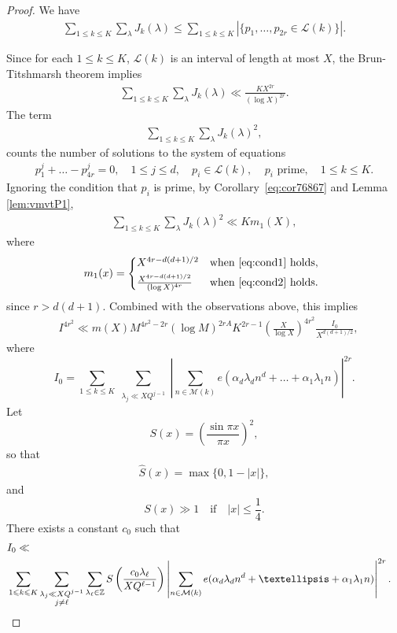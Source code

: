 \documentclass[12pt]{amsart}
\def\cL{{\mathcal L}}
\def\cM{{\mathcal M}}
\def\Z{{\mathbb Z}}
\def\\{\cr}
\def\le{\leqslant}
\begin{document}
\begin{proof}
We have 
\begin{align*}
\sum_{1\le k \le K}\sum_{\lambda} J_k(\lambda)\le \sum_{1\le k \le K}|\{ p_1,\dots,p_{2r}\in \cL(k)\}|.
\end{align*}



Since for each $1\le k \le K$,  $\cL(k)$ is an interval of length at most $X$, the Brun-Titshmarsh theorem implies 
\begin{align*}
\sum_{1\le k \le K}\sum_{\lambda} J_k(\lambda)\ll \frac{KX^{2r}}{(\log{X})^{2r}}.
\end{align*}
The term
\begin{align*}
\sum_{1\le k \le K}\sum_{\lambda} J_k(\lambda)^2,
\end{align*}
counts the number of solutions to the system of equations 
\begin{align}
\label{eq:123456-1}
p_1^{j}+\dots-p_{4r}^{j}=0, \quad 1\le j \le d, \quad p_i\in \cL(k), \ \ \text{ $p_i$ prime}, \quad 1\le k \le K.
\end{align}
Ignoring the condition that $p_i$ is prime, by Corollary~\ref{eq:cor76867} and Lemma \ref{lem:vmvtP1},
\begin{align*}
\sum_{1\le k \le K}\sum_{\lambda} J_k(\lambda)^2\ll K m_1(X), 
\end{align*}
where
$$m_1(x)=\begin{cases*}
X^{4r-d(d+1)/2}& \textit{when} \eqref{eq:cond1} \textit{holds},\\
\frac{X^{4r-d(d+1)/2}}{(\log X)^{4r}} & \textit{when} \eqref{eq:cond2} \textit{holds}.
\end{cases*} $$
since $r>d(d+1)$. Combined with the observations above, this implies 
\begin{align}
\label{eq:II0}
& I^{4r^2}\ll m(X) M^{4r^2-2r}(\log{M})^{2rA}K^{2r-1}\left(\frac{X}{\log{X}}\right)^{4r^2}\frac{I_0}{X^{d(d+1)/2}},
\end{align}
where 
$$I_0=\sum_{1\le k \le K}\sum_{\substack{ \lambda_j \ll XQ^{j-1}}}\left|\sum_{n\in \cM(k)}e(\alpha_d\lambda_d n^{d}+\dots+\alpha_1\lambda_1 n)\right|^{2r}.$$
Let 
$$S(x)=\left(\frac{\sin{\pi x}}{\pi x}\right)^2,$$
so that 
\begin{align}
\label{eq:Shat}
\widehat S(x)=\max\{0,1-|x|\},
\end{align}
and 
$$S(x) \gg 1 \quad \text{if} \quad |x|\le \frac{1}{4}.$$
There exists a constant $c_0$ such that 
\begin{align*}
&I_0\ll \\ & \sum_{1\le k \le K}\sum_{\substack{ \lambda_j \ll XQ^{j-1} \\  j\neq \ell}}\sum_{\lambda_{\ell}\in \Z}S\left(\frac{c_0\lambda_{\ell}}{XQ^{\ell-1}}\right)\left|\sum_{n\in \cM(k)}e(\alpha_d\lambda_d n^{d}+\dots+\alpha_1\lambda_1 n)\right|^{2r}.
\end{align*}


\end{proof}
\end{document}
